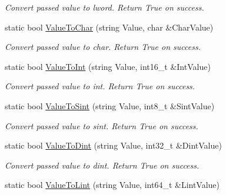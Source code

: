 \begin{DoxyCompactItemize}
\begin{DoxyCompactList}\small\item\em Convert passed value to lword. Return True on success. \end{DoxyCompactList}\item 
static bool \hyperlink{classpc__emulator_1_1DataTypeUtils_a8a43a772fca227b96240a38022c5ceb9}{Value\+To\+Char} (string Value, char \&Char\+Value)\hypertarget{classpc__emulator_1_1DataTypeUtils_a8a43a772fca227b96240a38022c5ceb9}{}\label{classpc__emulator_1_1DataTypeUtils_a8a43a772fca227b96240a38022c5ceb9}

\begin{DoxyCompactList}\small\item\em Convert passed value to char. Return True on success. \end{DoxyCompactList}\item 
static bool \hyperlink{classpc__emulator_1_1DataTypeUtils_a7a87e26bc6fd076f012f0ba02c96c866}{Value\+To\+Int} (string Value, int16\+\_\+t \&Int\+Value)\hypertarget{classpc__emulator_1_1DataTypeUtils_a7a87e26bc6fd076f012f0ba02c96c866}{}\label{classpc__emulator_1_1DataTypeUtils_a7a87e26bc6fd076f012f0ba02c96c866}

\begin{DoxyCompactList}\small\item\em Convert passed value to int. Return True on success. \end{DoxyCompactList}\item 
static bool \hyperlink{classpc__emulator_1_1DataTypeUtils_a6250d59717b5dff66f0847a9ecf09709}{Value\+To\+Sint} (string Value, int8\+\_\+t \&Sint\+Value)\hypertarget{classpc__emulator_1_1DataTypeUtils_a6250d59717b5dff66f0847a9ecf09709}{}\label{classpc__emulator_1_1DataTypeUtils_a6250d59717b5dff66f0847a9ecf09709}

\begin{DoxyCompactList}\small\item\em Convert passed value to sint. Return True on success. \end{DoxyCompactList}\item 
static bool \hyperlink{classpc__emulator_1_1DataTypeUtils_a42b5e4153755796a740a2450b404a818}{Value\+To\+Dint} (string Value, int32\+\_\+t \&Dint\+Value)\hypertarget{classpc__emulator_1_1DataTypeUtils_a42b5e4153755796a740a2450b404a818}{}\label{classpc__emulator_1_1DataTypeUtils_a42b5e4153755796a740a2450b404a818}

\begin{DoxyCompactList}\small\item\em Convert passed value to dint. Return True on success. \end{DoxyCompactList}\item 
static bool \hyperlink{classpc__emulator_1_1DataTypeUtils_abcb1021b4660fc9c65b5fc0f81f43154}{Value\+To\+Lint} (string Value, int64\+\_\+t \&Lint\+Value)\hypertarget{classpc__emulator_1_1DataTypeUtils_abcb1021b4660fc9c65b5fc0f81f43154}{}\label{classpc__emulator_1_1DataTypeUtils_abcb1021b4660fc9c65b5fc0f81f43154}


\end{DoxyCompactItemize}
